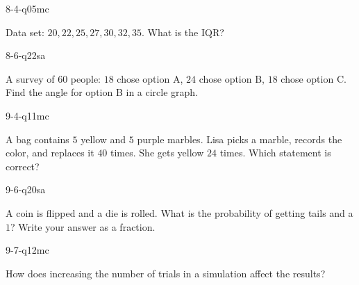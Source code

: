 \begin{practiceQuestion}{8-4-q05}{mc}
\begin{questionText}
Data set: $20, 22, 25, 27, 30, 32, 35$. What is the IQR?
\end{questionText}
\end{practiceQuestion}

\begin{practiceQuestion}{8-6-q22}{sa}
\begin{questionText}
A survey of $60$ people: $18$ chose option A, $24$ chose option B, $18$ chose option C. Find the angle for option B in a circle graph.
\end{questionText}
\end{practiceQuestion}

\begin{practiceQuestion}{9-4-q11}{mc}
\begin{questionText}
A bag contains $5$ yellow and $5$ purple marbles. Lisa picks a marble, records the color, and replaces it $40$ times. She gets yellow $24$ times. Which statement is correct?
\end{questionText}
\end{practiceQuestion}

\begin{practiceQuestion}{9-6-q20}{sa}
\begin{questionText}
A coin is flipped and a die is rolled. What is the probability of getting tails and a $1$? Write your answer as a fraction.
\end{questionText}
\end{practiceQuestion}

\begin{practiceQuestion}{9-7-q12}{mc}
\begin{questionText}
How does increasing the number of trials in a simulation affect the results?
\end{questionText}
\end{practiceQuestion}
